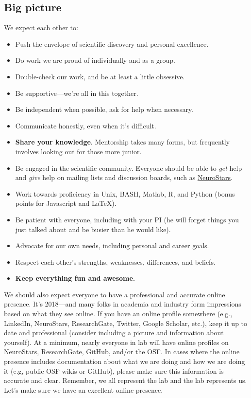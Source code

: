 \documentclass[letterpaper,12pt,oneside]{memoir}
\begin{document}
\subsection{Big picture}

We expect each other to:

\begin{itemize}
\item Push the envelope of scientific discovery and personal excellence. 
\item Do work we are proud of individually and as a group.
\item Double-check our work, and be at least a little obsessive.
\item Be supportive---we're all in this together.
\item Be independent when possible, ask for help when necessary.
\item Communicate honestly, even when it's difficult.
\item \textbf{Share your knowledge}. Mentorship takes many forms, but frequently involves looking out for those more junior.
\item Be engaged in the scientific community. Everyone should be able to \textit{get} help and \textit{give} help on mailing lists and discussion boards, such as \href{https://neurostars.org}{NeuroStars}.
\item Work towards proficiency in Unix, BASH, Matlab, R, and Python (bonus points for Javascript and \LaTeX).
\item Be patient with everyone, including with your PI (he will forget things you just talked about and be busier than he would like).
\item Advocate for our own needs, including personal and career goals.
\item Respect each other's strengths, weaknesses, differences, and beliefs.
\item \textbf{Keep everything fun and awesome.}
\end{itemize}

We should also expect everyone to have a professional and accurate online presence. It's 2018---and many folks in academia and industry form impressions based on what they see online. If you have an online profile somewhere (e.g., LinkedIn, NeuroStars, ResearchGate, Twitter, Google Scholar, etc.), keep it up to date and professional (consider including a picture and information about yourself). At a minimum, nearly everyone in lab will have online profiles on NeuroStars, ResearchGate, GitHub, and/or the OSF. In cases where the online presence includes documentation about what we are doing and how we are doing it (e.g, public OSF wikis or GitHub), please make sure this information is accurate and clear. Remember, we all represent the lab and the lab represents us. Let's make sure we have an excellent online presence.
\end{document}
